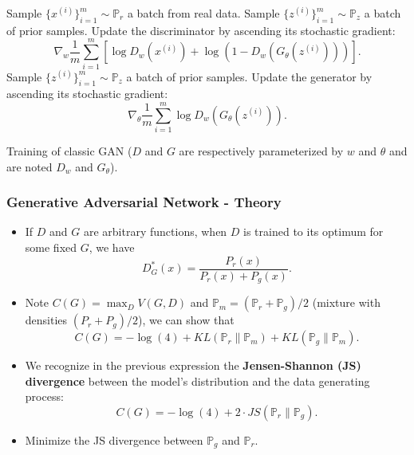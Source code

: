 \begin{frame}
  \begin{algorithm}[H]
  \begin{algorithmic}[1]
    \begin{small}
        \STATE Sample $\{x^{(i)}\}_{i=1}^m \sim \mathbb{P}_r$ a batch
          from real data.
        \STATE Sample $\{z^{(i)}\}_{i=1}^m \sim \mathbb{P}_z$ a batch
          of prior samples.
        \STATE Update the discriminator by ascending its stochastic gradient:
          \[
            \nabla_w\frac{1}{m}
            \sum_{i=1}^m[\log D_w(x^{(i)})
            +\log(1-D_w(G_{\theta}(z^{(i)})))].
          \]
      \ENDFOR
      \STATE Sample $\{z^{(i)}\}_{i=1}^m \sim \mathbb{P}_z$ a batch
        of prior samples.
      \STATE Update the generator by ascending its stochastic gradient:
        \[
          \nabla_{\theta}\frac{1}{m}
          \sum_{i=1}^m \log D_w(G_{\theta}(z^{(i)})).
        \]
    \ENDFOR
    \end{small}
  \end{algorithmic}
    \caption{Training of classic GAN ($D$ and $G$ are respectively
      parameterized by $w$ and $\theta$ and are noted $D_w$ and
      $G_{\theta}$).}
  \end{algorithm}
\end{frame}

\begin{frame}
  \frametitle{Generative Adversarial Network - Theory}
  \begin{itemize}
    \item If $D$ and $G$ are arbitrary functions, when $D$ is trained to its
      optimum for some fixed $G$, we have
      \[ 
        D_G^*(x) = \frac{P_r(x)}{P_r(x) + P_g(x)}.
      \]
    \item Note $C(G) = \max_D V(G, D)$ and
      $\mathbb{P}_m = (\mathbb{P}_r+\mathbb{P}_g)/2$ (mixture
      with densities $(P_r+P_g)/2$), we can show that
      \[
        C(G) = -\log(4) + KL(\mathbb{P}_r \| \mathbb{P}_m) 
        + KL(\mathbb{P}_g \| \mathbb{P}_m).
      \]
    \item We recognize in the previous expression the \textbf{Jensen-Shannon
      (JS) divergence} between the model's distribution and the data
      generating process:
      \[ C(G) = -\log(4) + 2 \cdot JS(\mathbb{P}_r\|\mathbb{P}_g). \]
    \item Minimize the JS divergence between $\mathbb{P}_g$ and $\mathbb{P}_r$.
  \end{itemize}
\end{frame}

